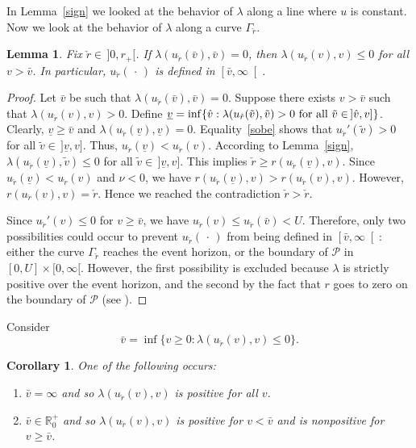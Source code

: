 \documentclass[a4paper,11pt,oneside,reqno]{amsart}
\newtheorem{Lem}[Thm]{Lemma}
\newtheorem{Cor}[Thm]{Corollary}
\newcommand{\cal}{\mathcal}
\newcommand{\R}{\mathbb{R}}
\newcommand{\mysigma}{{\cal P}}
\newcommand{\myumax}{U}
\newcommand{\ckr}{\check{r}}
\newcommand{\uckr}{u_{\ckr}}
\begin{document}
In Lemma~\ref{sign} we looked at the behavior of $\lambda$ along a line where $u$ is constant.
Now we look at the behavior of $\lambda$ along a curve $\Gamma_{\ckr}$.
\begin{Lem}\label{domain} Fix $\ckr\in\,]0,r_+[$.
If $\lambda(\uckr(\bar v),\bar v)=0$, then $\lambda(\uckr(v),v)\leq 0$ for all $v>\bar v$. In particular, $\uckr(\,\cdot\,)$ is defined in $\left[\bar v,\infty\right[$.
\end{Lem}
\begin{proof}
Let $\bar v$ be such that $\lambda(\uckr(\bar v),\bar v)=0$.
Suppose there exists $v>\bar v$ such that $\lambda(\uckr(v),v)>0$.
Define $\underline{v}=\inf\{\hat{v}:
\lambda(\uckr(\tilde{v}),\tilde{v})>0\ {\rm for\ all}\ \tilde{v}\in\,
]\hat{v},v]\}$. Clearly, $\underline{v}\geq\bar{v}$ and
$\lambda(\uckr(\underline{v}),\underline{v})=0$.
Equality~\eqref{sobe} shows that $\uckr'(\tilde v)>0$ for all
$\tilde{v}\in\,]\underline{v},v]$. 
Thus, $\uckr(\underline{v})<\uckr(v)$.
According to Lemma~\ref{sign},
$\lambda(\uckr(\underline{v}),\tilde v)\leq 0$ for all 
$\tilde{v}\in\,]\underline{v},v]$. This implies
$\ckr\geq r(\uckr(\underline{v}),v)$. Since
$\uckr(\underline{v})<\uckr(v)$ and $\nu<0$, we have
$r(\uckr(\underline{v}),v)>r(\uckr(v),v)$.
However, $r(\uckr(v),v)=\ckr$.
Hence we reached the contradiction $\ckr>\ckr$.

Since $\uckr'(v) \leq 0$ for $v \geq \bar v$, we have $\uckr(v)\leq \uckr(\bar v) < U$. Therefore, only two possibilities could occur to prevent $\uckr(\,\cdot\,)$ from being defined in $\left[\bar v,\infty\right[$: either the curve $\Gamma_{\ckr}$ reaches the event horizon, or the boundary of $\mysigma$ in $[0,\myumax]\times[0,\infty[$. However, the first possibility is excluded because $\lambda$ is strictly positive over the event horizon, and the second by the fact that $r$ goes to zero on the boundary of $\mysigma$ (see \cite{relIst1}).
\end{proof}
Consider 
$$
\bar v=\inf\{v\geq 0:\lambda(\uckr(v),v)\leq 0\}.
$$

\begin{Cor}
One of the following occurs:
\begin{enumerate}[{\rm (a)}]
\item $\bar v=\infty$ and so $\lambda(\uckr(v),v)$ is positive for all $v$.
\item $\bar v\in\R^+_0$ and so $\lambda(\uckr(v),v)$ is positive for 
$v<\bar v$ 
and is nonpositive for $v\geq\bar v$.
\end{enumerate} 
\end{Cor}
\end{document}
